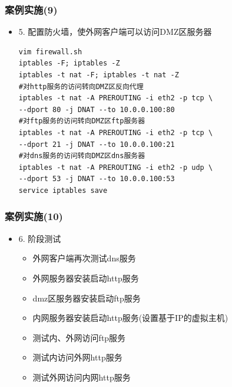 \documentclass[xcolor=svgnames,presentation]{beamer}
\begin{document}
\begin{frame}[fragile]
\frametitle{案例实施(9)}
\label{sec-5-11}
\begin{itemize}

\item 5. 配置防火墙，使外网客户端可以访问DMZ区服务器\\
\label{sec-5-11-1}%
\begin{verbatim}
vim firewall.sh
iptables -F; iptables -Z
iptables -t nat -F; iptables -t nat -Z
#对http服务的访问转向DMZ区反向代理
iptables -t nat -A PREROUTING -i eth2 -p tcp \
--dport 80 -j DNAT --to 10.0.0.100:80
#对ftp服务的访问转向DMZ区ftp服务器
iptables -t nat -A PREROUTING -i eth2 -p tcp \
--dport 21 -j DNAT --to 10.0.0.100:21
#对dns服务的访问转向DMZ区dns服务器
iptables -t nat -A PREROUTING -i eth2 -p udp \
--dport 53 -j DNAT --to 10.0.0.100:53
service iptables save
\end{verbatim}
\end{itemize} %
\end{frame}
\begin{frame}
\frametitle{案例实施(10)}
\label{sec-5-12}
\begin{itemize}

\item 6. 阶段测试
\label{sec-5-12-1}%
\begin{itemize}

\item 外网客户端再次测试dns服务
\label{sec-5-12-1-1}%

\item 外网服务器安装启动http服务
\label{sec-5-12-1-2}%

\item dmz区服务器安装启动ftp服务
\label{sec-5-12-1-3}%

\item 内网服务器安装启动http服务(设置基于IP的虚拟主机)
\label{sec-5-12-1-4}%

\item 测试内、外网访问ftp服务
\label{sec-5-12-1-5}%

\item 测试内访问外网http服务
\label{sec-5-12-1-6}%

\item 测试外网访问内网http服务
\label{sec-5-12-1-7}%
\end{itemize} %
\end{itemize} %
\end{frame}
\end{document}
